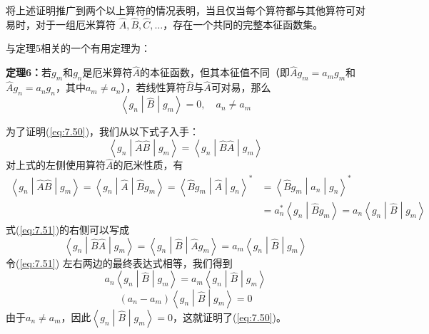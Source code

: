     将上述证明推广到两个以上算符的情况表明，当且仅当每个算符都与其他算符可对易时，对于一组厄米算符 $\hat{A},\hat{B},\hat{C},\ldots$，存在一个共同的完整本征函数集。

    与定理5相关的一个有用定理为：
    \begin{center}
        \parbox{0.8\textwidth}{
            \textbf{定理6：}若$g_m$和$g_n$是厄米算符$\hat{A}$的本征函数，但其本征值不同（即$\hat{A}g_m = a_mg_m$和$\hat{A}g_n = a_ng_n$，其中$a_m \neq a_n$），若线性算符$\hat{B}$与$\hat{A}$可对易，那么
            \begin{equation}
                \left\langle g_n \middle| \hat{B} \middle| g_m \right\rangle = 0, \quad a_n \neq a_m
                \label{eq:7.50}
            \end{equation}
        }
    \end{center}

    为了证明(\ref{eq:7.50})，我们从以下式子入手：
    \begin{equation}
        \left\langle g_n \middle| \hat{A}\hat{B} \middle| g_m \right\rangle = \left\langle g_n \middle| \hat{B}\hat{A} \middle| g_m \right\rangle
        \label{eq:7.51}
    \end{equation}
    对上式的左侧使用算符$\hat{A}$的厄米性质，有
    \begin{equation*}
        \begin{aligned}
            \left\langle g_n \middle| \hat{A}\hat{B} \middle| g_m \right\rangle = \left\langle g_n \middle| \hat{A} \middle| \hat{B} g_m \right\rangle = \left\langle \hat{B}g_m \middle| \hat{A} \middle| g_n \right\rangle^{\ast} &= \left\langle \hat{B}g_m \middle| a_n \middle| g_n \right\rangle^{\ast} \\
            &= a_n^{\ast}\left\langle g_n \middle| \hat{B}g_m \right\rangle = a_n\left\langle g_n \middle| \hat{B} \middle| g_m \right\rangle
        \end{aligned}
    \end{equation*}
    式(\ref{eq:7.51})的右侧可以写成
    \begin{equation*}
        \left\langle g_n \middle| \hat{B}\hat{A} \middle| g_m \right\rangle = \left\langle g_n \middle| \hat{B} \middle| \hat{A}g_m \right\rangle = a_m\left\langle g_n \middle| \hat{B} \middle| g_m \right\rangle
    \end{equation*}
    令(\ref{eq:7.51}) 左右两边的最终表达式相等，我们得到
    \begin{equation*}
        a_n \left\langle g_n \middle| \hat{B} \middle| g_m \right\rangle = a_m\left\langle g_n \middle| \hat{B} \middle| g_m \right\rangle
    \end{equation*}
    \begin{equation*}
        \left(a_n - a_m\right)\left\langle g_n \middle| \hat{B} \middle| g_m \right\rangle = 0
    \end{equation*}
    由于$a_n \neq a_m$，因此$\left\langle g_n \middle| \hat{B} \middle| g_m \right\rangle = 0$，这就证明了(\ref{eq:7.50})。

